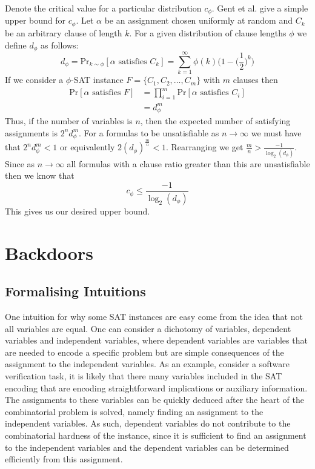 Denote the critical value for a particular distribution $c_\phi$. Gent et al.
give a simple upper bound for $c_\phi$. Let $\alpha$ be an assignment chosen
uniformly at random and $C_k$ be an arbitrary clause of length $k$.
For a given distribution of clause lengths $\phi$ we define
$d_\phi$ as follows:
\begin{equation}
    d_\phi = \mathrm{Pr}_{k \sim \phi}[\alpha \text{ satisfies } C_k] = \sum_{k=1}^{\infty}\phi(k) \Big(1 - \Big(\frac{1}{2} \Big)^k \Big)
\end{equation}
If we consider a $\phi$-SAT instance $F = \{C_1, C_2, \dots, C_m\}$
with $m$ clauses then
\begin{align*}
    \mathrm{Pr}[\alpha \text{ satisfies } F] &= \prod_{i = 1}^{m}\mathrm{Pr}[\alpha \text{ satisfies } C_i] \\
    &= d_\phi^m
\end{align*}
Thus, if the number of variables is $n$, then the expected number of satisfying
assignments is $2^n d_\phi^m$. For a formulas to be unsatisfiable as $n \to \infty$
we must have that $2^n d_\phi^m < 1$ or equivalently $2(d_\phi)^{\frac{m}{n}} < 1$.
Rearranging we get $\frac{m}{n} > \frac{-1}{\log_2(d_\phi)}$. Since as $n \to \infty$
all formulas with a clause ratio greater than this are unsatisfiable then we know that
\begin{equation}
    c_\phi \leq \frac{-1}{\log_2(d_\phi)}
\end{equation}
This gives us our desired upper bound.

\section{Backdoors}
\subsection{Formalising Intuitions}
One intuition for why some SAT instances are easy come from the idea
that not all variables are equal. One can consider a dichotomy of variables,
dependent variables and independent variables, where dependent variables are
variables that are needed to encode a specific problem but are simple consequences
of the assignment to the independent variables. As an example, consider a software
verification task, it is likely that there many variables included in the SAT
encoding that are encoding straightforward implications or auxiliary information.
The assignments to these variables can be quickly deduced after the heart
of the combinatorial problem is solved, namely finding an assignment
to the independent variables. As such, 
dependent variables do not contribute to the combinatorial hardness of the instance,
since it is sufficient to find an assignment to the independent variables and the
dependent variables can be determined efficiently from this assignment.\cite{gerevini2003planning}

